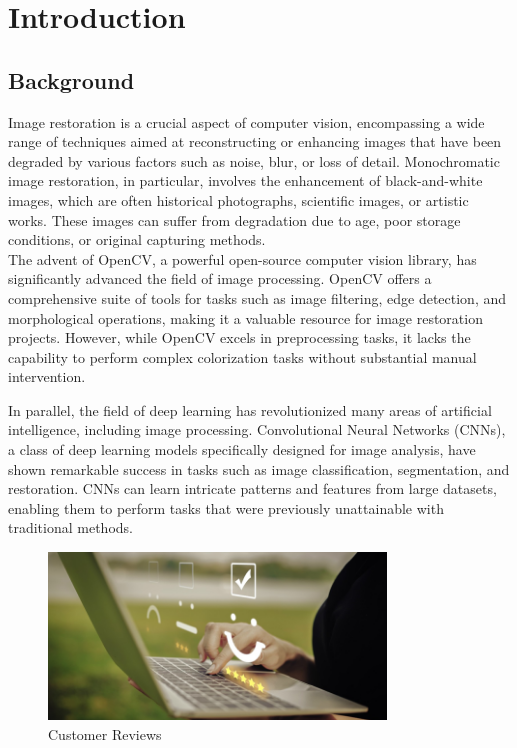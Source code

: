 \chapter{Introduction}

\section{Background}
Image restoration is a crucial aspect of computer vision, encompassing a wide range of techniques aimed at reconstructing or enhancing images that have been degraded by various factors such as noise, blur, or loss of detail. Monochromatic image restoration, in particular, involves the enhancement of black-and-white images, which are often historical photographs, scientific images, or artistic works. These images can suffer from degradation due to age, poor storage conditions, or original capturing methods.
\\

The advent of OpenCV, a powerful open-source computer vision library, has significantly advanced the field of image processing. OpenCV offers a comprehensive suite of tools for tasks such as image filtering, edge detection, and morphological operations, making it a valuable resource for image restoration projects. However, while OpenCV excels in preprocessing tasks, it lacks the capability to perform complex colorization tasks without substantial manual intervention.

In parallel, the field of deep learning has revolutionized many areas of artificial intelligence, including image processing. Convolutional Neural Networks (CNNs), a class of deep learning models specifically designed for image analysis, have shown remarkable success in tasks such as image classification, segmentation, and restoration. CNNs can learn intricate patterns and features from large datasets, enabling them to perform tasks that were previously unattainable with traditional methods.
\begin{figure}[H]
		\centering
		\includegraphics[width=0.8\textwidth]{Pictures/intro1.png}
		\caption{Customer Reviews}
\end{figure}
